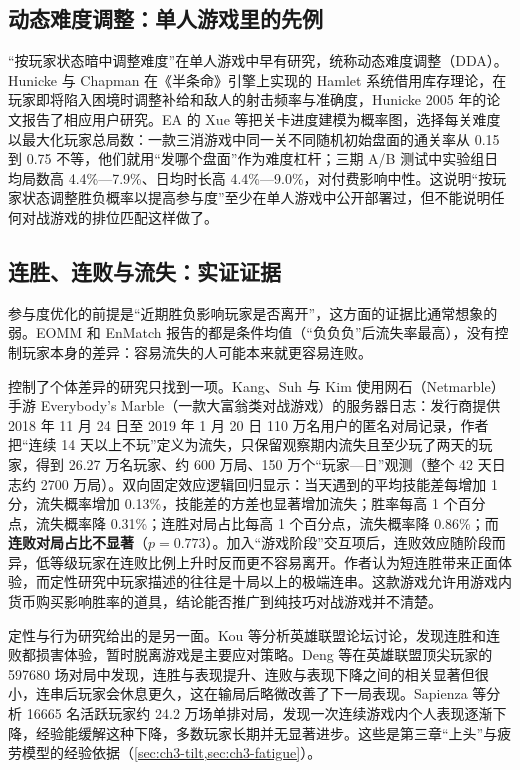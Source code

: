 \subsection{动态难度调整：单人游戏里的先例}\label{sec:1a-dda}

“按玩家状态暗中调整难度”在单人游戏中早有研究，统称动态难度调整（DDA）。Hunicke 与 Chapman 在《半条命》引擎上实现的 Hamlet 系统借用库存理论，在玩家即将陷入困境时调整补给和敌人的射击频率与准确度\cite{hunicke2004ai}\tagLit，Hunicke 2005 年的论文报告了相应用户研究\cite{hunicke2005case}\tagLit{}。EA 的 Xue 等把关卡进度建模为概率图，选择每关难度以最大化玩家总局数\cite{xue2017dynamic}\tagLit：一款三消游戏中同一关不同随机初始盘面的通关率从 0.15 到 0.75 不等，他们就用“发哪个盘面”作为难度杠杆；三期 A/B 测试中实验组日均局数高 4.4\%—7.9\%、日均时长高 4.4\%—9.0\%，对付费影响中性。这说明“按玩家状态调整胜负概率以提高参与度”至少在单人游戏中公开部署过，但不能说明任何对战游戏的排位匹配这样做了。

\subsection{连胜、连败与流失：实证证据}\label{sec:1a-churn}

参与度优化的前提是“近期胜负影响玩家是否离开”，这方面的证据比通常想象的弱。EOMM 和 EnMatch 报告的都是条件均值（“负负负”后流失率最高），没有控制玩家本身的差异：容易流失的人可能本来就更容易连败\cite{chen2017eomm,wang2024enmatch}\tagLit。

控制了个体差异的研究只找到一项。Kang、Suh 与 Kim 使用网石（Netmarble）手游 Everybody's Marble（一款大富翁类对战游戏）的服务器日志：发行商提供 2018 年 11 月 24 日至 2019 年 1 月 20 日 110 万名用户的匿名对局记录，作者把“连续 14 天以上不玩”定义为流失，只保留观察期内流失且至少玩了两天的玩家，得到 26.27 万名玩家、约 600 万局、150 万个“玩家—日”观测（整个 42 天日志约 2700 万局）\cite{kang2024match}\tagLit。双向固定效应逻辑回归显示：当天遇到的平均技能差每增加 1 分，流失概率增加 0.13\%，技能差的方差也显著增加流失；胜率每高 1 个百分点，流失概率降 0.31\%；连胜对局占比每高 1 个百分点，流失概率降 0.86\%；而\textbf{连败对局占比不显著}（$p=0.773$）。加入“游戏阶段”交互项后，连败效应随阶段而异，低等级玩家在连败比例上升时反而更不容易离开。作者认为短连胜带来正面体验，而定性研究中玩家描述的往往是十局以上的极端连串。这款游戏允许用游戏内货币购买影响胜率的道具，结论能否推广到纯技巧对战游戏并不清楚。

定性与行为研究给出的是另一面。Kou 等分析英雄联盟论坛讨论，发现连胜和连败都损害体验，暂时脱离游戏是主要应对策略\cite{kou2018playing}\tagLit\needcheck[；只读到摘要]。Deng 等在英雄联盟顶尖玩家的 597680 场对局中发现，连胜与表现提升、连败与表现下降之间的相关显著但很小，连串后玩家会休息更久，这在输局后略微改善了下一局表现\cite{deng2024streaks}\tagLit\needcheck[；只读到摘要]。Sapienza 等分析 16665 名活跃玩家约 24.2 万场单排对局，发现一次连续游戏内个人表现逐渐下降，经验能缓解这种下降，多数玩家长期并无显著进步\cite{sapienza2018individual}\tagLit。这些是第三章“上头”与疲劳模型的经验依据（\cref{sec:ch3-tilt,sec:ch3-fatigue}）。

